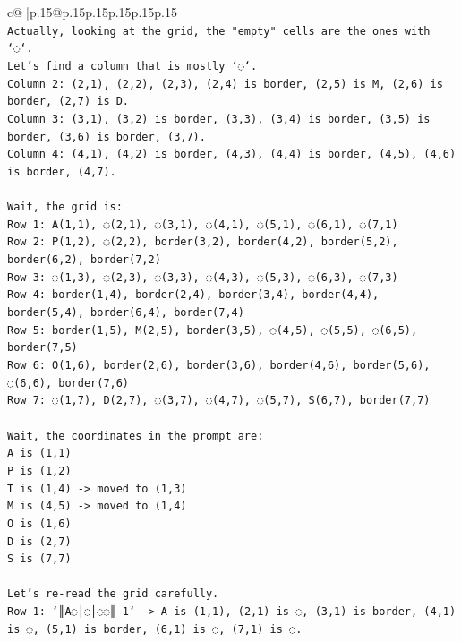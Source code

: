 \documentclass{article}
\begin{document}
{\begin{supertabular}{c@{$\;$}|p{.15\linewidth}@{}p{.15\linewidth}p{.15\linewidth}p{.15\linewidth}p{.15\linewidth}p{.15\linewidth}}
{{{\\ 
\texttt{Actually, looking at the grid, the "empty" cells are the ones with `◌`.} \\
\texttt{Let's find a column that is mostly `◌`.} \\
\texttt{Column 2: (2,1), (2,2), (2,3), (2,4) is border, (2,5) is M, (2,6) is border, (2,7) is D.} \\
\texttt{Column 3: (3,1), (3,2) is border, (3,3), (3,4) is border, (3,5) is border, (3,6) is border, (3,7).} \\
\texttt{Column 4: (4,1), (4,2) is border, (4,3), (4,4) is border, (4,5), (4,6) is border, (4,7).} \\
\\ 
\texttt{Wait, the grid is:} \\
\texttt{Row 1: A(1,1), ◌(2,1), ◌(3,1), ◌(4,1), ◌(5,1), ◌(6,1), ◌(7,1)} \\
\texttt{Row 2: P(1,2), ◌(2,2), border(3,2), border(4,2), border(5,2), border(6,2), border(7,2)} \\
\texttt{Row 3: ◌(1,3), ◌(2,3), ◌(3,3), ◌(4,3), ◌(5,3), ◌(6,3), ◌(7,3)} \\
\texttt{Row 4: border(1,4), border(2,4), border(3,4), border(4,4), border(5,4), border(6,4), border(7,4)} \\
\texttt{Row 5: border(1,5), M(2,5), border(3,5), ◌(4,5), ◌(5,5), ◌(6,5), border(7,5)} \\
\texttt{Row 6: O(1,6), border(2,6), border(3,6), border(4,6), border(5,6), ◌(6,6), border(7,6)} \\
\texttt{Row 7: ◌(1,7), D(2,7), ◌(3,7), ◌(4,7), ◌(5,7), S(6,7), border(7,7)} \\
\\ 
\texttt{Wait, the coordinates in the prompt are:} \\
\texttt{A is (1,1)} \\
\texttt{P is (1,2)} \\
\texttt{T is (1,4) {-}> moved to (1,3)} \\
\texttt{M is (4,5) {-}> moved to (1,4)} \\
\texttt{O is (1,6)} \\
\texttt{D is (2,7)} \\
\texttt{S is (7,7)} \\
\\ 
\texttt{Let's re{-}read the grid carefully.} \\
\texttt{Row 1: `║A◌│◌│◌◌║ 1` {-}> A is (1,1), (2,1) is ◌, (3,1) is border, (4,1) is ◌, (5,1) is border, (6,1) is ◌, (7,1) is ◌.} \\
}}}
\end{supertabular}}
\end{document}
